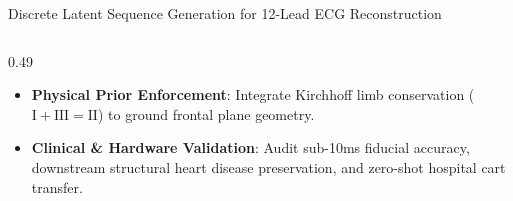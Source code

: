 \documentclass[aspectratio=169,10pt]{beamer}
\begin{document}
\begin{frame}[t]{Discrete Latent Sequence Generation for 12-Lead ECG Reconstruction}
\begin{columns}[T]
\begin{column}{0.49\textwidth}
\begin{tcolorbox}[cardstyle,colframe=SuccessGreen,top=1mm,bottom=1mm,left=2mm,right=2mm,title={\bfseries\fontsize{7.5}{9}\selectfont\color{SuccessGreen}Purpose of the Study}]
\begin{itemize}
          \item \textbf{Physical Prior Enforcement}: Integrate Kirchhoff limb conservation ($\text{I} + \text{III} = \text{II}$) to ground frontal plane geometry.
          \item \textbf{Clinical \& Hardware Validation}: Audit sub-10ms fiducial accuracy, downstream structural heart disease preservation, and zero-shot hospital cart transfer.
        \end{itemize}
      \end{tcolorbox}
    \end{column}
  \end{columns}
\end{frame}

\end{document}
